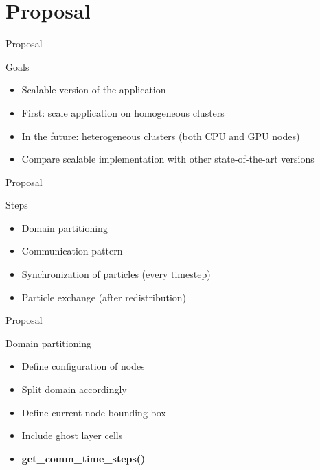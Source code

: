 \documentclass[aspectratio=43,t]{beamer}
\begin{document}
  \section{Proposal}
  \begin{frame}{Proposal}
    \begin{block}{Goals}
      \begin{itemize}
        \item Scalable version of the application
        \item First: scale application on homogeneous clusters
        \item In the future: heterogeneous clusters (both CPU and GPU nodes)
        \item Compare scalable implementation with other state-of-the-art versions
      \end{itemize}
    \end{block}
  \end{frame}

  \begin{frame}{Proposal}
    \begin{block}{Steps}
      \begin{itemize}
        \item Domain partitioning
        \item Communication pattern
        \item Synchronization of particles (every timestep)
        \item Particle exchange (after redistribution)
      \end{itemize}
    \end{block}
  \end{frame}

  \begin{frame}{Proposal}
    \begin{block}{Domain partitioning}
      \begin{itemize}
        \item Define configuration of nodes
        \item Split domain accordingly
        \item Define current node bounding box
        \item Include ghost layer cells
        \item \textbf{get\_comm\_time\_steps()}
      \end{itemize}
    \end{block}
  \end{frame}
\end{document}
